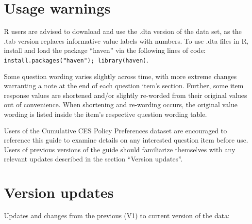 \documentclass[
  12pt]{article}
\begin{document}
\newpage

\hypertarget{usage-warnings}{%
\section{Usage warnings}\label{usage-warnings}}

R users are advised to download and use the .dta version of the data
set, as the .tab version replaces informative value labels with numbers.
To use .dta files in R, install and load the package ``haven'' via the
following lines of code:
\texttt{install.packages("haven");\ library(haven)}.

\medskip

Some question wording varies slightly across time, with more extreme
changes warranting a note at the end of each question item's section.
Further, some item response values are shortened and/or slightly
re-worded from their original values out of convenience. When shortening
and re-wording occurs, the original value wording is listed inside the
item's respective question wording table.

\medskip

Users of the Cumulative CES Policy Preferences dataset are encouraged to
reference this guide to examine details on any interested question item
before use. Users of previous versions of the guide should familiarize
themselves with any relevant updates described in the section ``Version
updates''.

\hypertarget{version-updates}{%
\section{Version updates}\label{version-updates}}

Updates and changes from the previous (V1) to current version of the
data:
\end{document}
